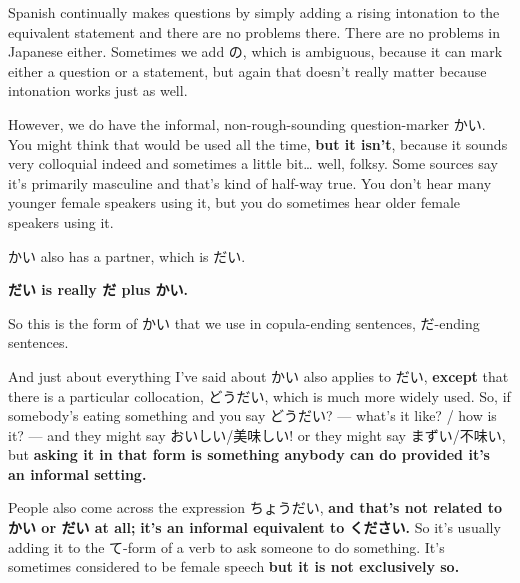 Spanish continually makes questions by simply adding a rising intonation to the equivalent statement and there are no problems there. There are no problems in Japanese either. Sometimes we add の, which is ambiguous, because it can mark either a question or a statement, but again that doesn't really matter because intonation works just as well.

{}

However, we do have the informal, non-rough-sounding question-marker かい. You might think that would be used all the time, {\bf but it isn't},\crlf
because it sounds very colloquial indeed and sometimes a little bit\ldots{} well, folksy. Some sources say it's primarily masculine and that's kind of half-way true. You don't hear many younger female speakers using it, but you do sometimes hear older female speakers using it.

\stopsectionlevel

\startsectionlevel[title={だい (& どうだい)},reference={だい-どうだい}]

かい also has a partner, which is だい.

{\bf だい is really だ plus かい.}

So this is the form of かい that we use in\crlf
copula-ending sentences, だ-ending sentences.

{}

And just about everything I've said about かい also applies to だい,\crlf
{\bf except} that there is a particular collocation, どうだい, which is much more widely used. So, if somebody's eating something and you say どうだい? --- what's it like? / how is it? --- and they might say おいしい/美味しい! or they might say まずい/不味い, but {\bf asking it in that form is something anybody can do provided it's an informal setting.}

\stopsectionlevel

\startsectionlevel[title={ちょうだい},reference={ちょうだい}]

People also come across the expression ちょうだい, {\bf and that's not related to かい or だい at all;} {\bf it's an informal equivalent to ください.} So it's usually adding it to the て-form of a verb to ask someone to do something. It's sometimes considered to be female speech {\bf but it is not exclusively so.}

{}

\stopsectionlevel

